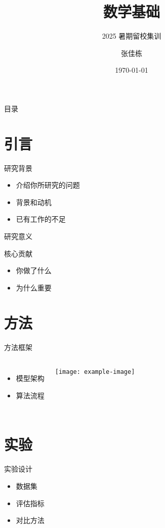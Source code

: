\documentclass[aspectratio=169]{beamer}  %
\title{数学基础}
\subtitle{2025 暑期留校集训}
\author{张佳栋}
\institute{东北大学\\计算机科学与工程学院}
\date{\today}
\begin{document}
\begin{frame}
  \titlepage
\end{frame}

\begin{frame}{目录}
  \tableofcontents
\end{frame}


\section{引言}
\begin{frame}{研究背景}
  \begin{itemize}
    \item 介绍你所研究的问题
    \item 背景和动机
    \item 已有工作的不足
  \end{itemize}
\end{frame}

\begin{frame}{研究意义}
  \begin{block}{核心贡献}
    \begin{itemize}
      \item 你做了什么
      \item 为什么重要
    \end{itemize}
  \end{block}
\end{frame}

\section{方法}
\begin{frame}{方法框架}
  \begin{columns}
      \begin{itemize}
        \item 模型架构
        \item 算法流程
      \end{itemize}
      \texttt{[image: example-image]}
  \end{columns}
\end{frame}

\section{实验}
\begin{frame}{实验设计}
  \begin{itemize}
    \item 数据集
    \item 评估指标
    \item 对比方法
  \end{itemize}
\end{frame}
\end{document}
